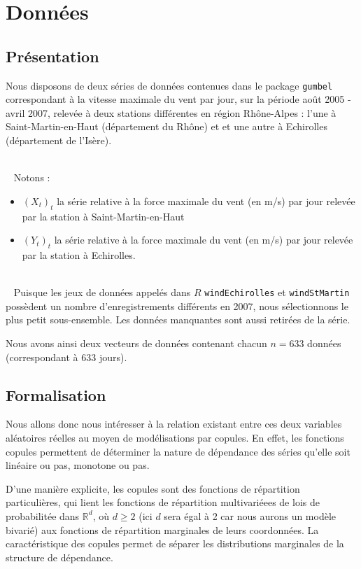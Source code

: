 
\section{Données}
\subsection{Présentation}

Nous disposons de deux séries de données contenues dans le package \lstinline!gumbel! correspondant à la vitesse maximale du vent par jour, sur la période août 2005 - avril 2007,
relevée à deux stations différentes en région Rhône-Alpes : l'une à Saint-Martin-en-Haut (département du Rhône) et et une autre à Echirolles (département de l'Isère).

~\\~
Notons :
\begin{itemize}
\item $(X_t)_t$ la série relative à la force maximale du vent (en m/s) par jour relevée par la station à Saint-Martin-en-Haut 
\item $(Y_t)_t$ la série relative à la force maximale du vent (en m/s) par jour relevée par la station à Echirolles.
\end{itemize}

~\\~
Puisque les jeux de données appelés dans $R$ \lstinline!windEchirolles! et \lstinline!windStMartin! possèdent 
un nombre d’enregistrements différents en 2007, nous sélectionnons le plus petit sous-ensemble. Les données manquantes sont aussi retirées de la série.

Nous avons ainsi deux vecteurs de données contenant chacun $n=633$ données (correspondant à 633 jours).


\subsection{Formalisation}

Nous allons donc nous intéresser à la relation existant entre ces deux variables aléatoires réelles au moyen de modélisations par copules.
En effet,  les fonctions copules permettent de déterminer la nature de dépendance des séries qu’elle soit linéaire ou pas, monotone ou pas.

D'une manière explicite, les copules sont des fonctions de répartition particulières,
qui lient les fonctions de répartition multivariéees de lois de probabilitée dans $\mathbb{R}^d$, où $d \geq 2$ (ici $d$ sera égal à 2 car nous aurons un modèle bivarié) aux fonctions de répartition marginales de leurs coordonnées. 
La caractéristique des copules permet de séparer les distributions marginales de la structure de dépendance.

